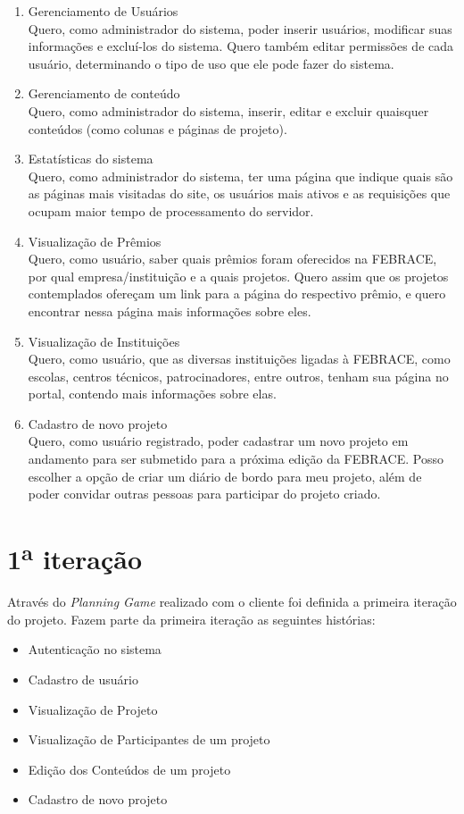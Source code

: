 \documentclass[a4paper,12pt,font=plain,header=plain]{abnt}
\begin{document}
\begin{enumerate}
	 \item Gerenciamento de Usuários \\
		Quero, como administrador do sistema, poder inserir usuários, modificar suas informações e excluí-los do sistema. Quero também editar permissões de cada usuário, determinando o tipo de uso que ele pode fazer do sistema.
	 \item Gerenciamento de conteúdo \\
		Quero, como administrador do sistema, inserir, editar e excluir quaisquer conteúdos (como colunas e páginas de projeto).
	 \item Estatísticas do sistema \\
		Quero, como administrador do sistema, ter uma página que indique quais são as páginas mais visitadas do site, os usuários mais ativos e as requisições que ocupam maior tempo de processamento do servidor.
	 \item Visualização de Prêmios \\
		Quero, como usuário, saber quais prêmios foram oferecidos na FEBRACE, por qual empresa/instituição e a quais projetos. Quero assim que os projetos contemplados ofereçam um link para a página do respectivo prêmio, e quero encontrar nessa página mais informações sobre eles.
	 \item Visualização de Instituições \\
		Quero, como usuário, que as diversas instituições ligadas à FEBRACE, como escolas, centros técnicos, patrocinadores, entre outros, tenham sua página no portal, contendo mais informações sobre elas.
	 \item Cadastro de novo projeto \\
		Quero, como usuário registrado, poder cadastrar um novo projeto em andamento para ser submetido para a próxima edição da FEBRACE. Posso escolher a opção de criar um diário de bordo para meu projeto, além de poder convidar outras pessoas para participar do projeto criado.
	\end{enumerate}

  	\section{1\textsuperscript{a} iteração}

	Através do \textit{Planning Game} realizado com o cliente foi definida a primeira iteração do projeto. Fazem parte da primeira iteração as seguintes histórias:

	\begin{itemize}
	 \item Autenticação no sistema
	 \item Cadastro de usuário
	 \item Visualização de Projeto
	 \item Visualização de Participantes de um projeto
	 \item Edição dos Conteúdos de um projeto
	 \item Cadastro de novo projeto
	\end{itemize}
\end{document}
